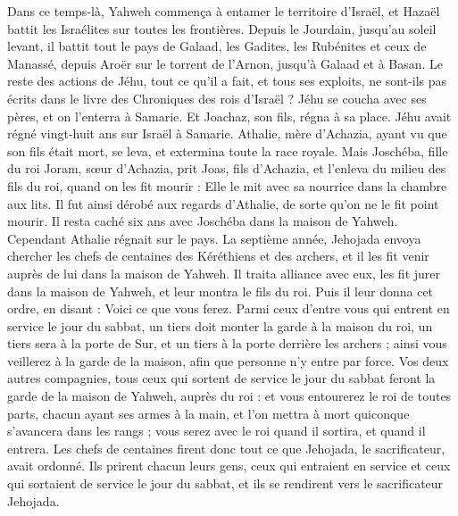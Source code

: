 \begin{multicols}{2}
Dans ce temps-là, Yahweh commença à entamer le territoire d’Israël, et Hazaël battit les Israélites sur toutes les frontières.
Depuis le Jourdain, jusqu’au soleil levant, il battit tout le pays de Galaad, les Gadites, les Rubénites et ceux de Manassé, depuis Aroër sur le torrent de l’Arnon, jusqu’à Galaad et à Basan.
Le reste des actions de Jéhu, tout ce qu’il a fait, et tous ses exploits, ne sont-ils pas écrits dans le livre des Chroniques des rois d’Israël ?
Jéhu se coucha avec ses pères, et on l’enterra à Samarie. Et Joachaz, son fils, régna à sa place.
Jéhu avait régné vingt-huit ans sur Israël à Samarie.
\VerseOne{}Athalie, mère d’Achazia, ayant vu que son fils était mort, se leva, et extermina toute la race royale.
Mais Joschéba, fille du roi Joram, sœur d’Achazia, prit Joas, fils d’Achazia, et l’enleva du milieu des fils du roi, quand on les fit mourir : Elle le mit avec sa nourrice dans la chambre aux lits. Il fut ainsi dérobé aux regards d’Athalie, de sorte qu’on ne le fit point mourir.
Il resta caché six ans avec Joschéba dans la maison de Yahweh. Cependant Athalie régnait sur le pays.
La septième année, Jehojada envoya chercher les chefs de centaines des Kéréthiens et des archers, et il les fit venir auprès de lui dans la maison de Yahweh. Il traita alliance avec eux, les fit jurer dans la maison de Yahweh, et leur montra le fils du roi.
Puis il leur donna cet ordre, en disant : Voici ce que vous ferez. Parmi ceux d’entre vous qui entrent en service le jour du sabbat, un tiers doit monter la garde à la maison du roi,
un tiers sera à la porte de Sur, et un tiers à la porte derrière les archers ; ainsi vous veillerez à la garde de la maison, afin que personne n’y entre par force.
Vos deux autres compagnies, tous ceux qui sortent de service le jour du sabbat feront la garde de la maison de Yahweh, auprès du roi :
et vous entourerez le roi de toutes parts, chacun ayant ses armes à la main, et l’on mettra à mort quiconque s’avancera dans les rangs ; vous serez avec le roi quand il sortira, et quand il entrera.
Les chefs de centaines firent donc tout ce que Jehojada, le sacrificateur, avait ordonné. Ils prirent chacun leurs gens, ceux qui entraient en service et ceux qui sortaient de service le jour du sabbat, et ils se rendirent vers le sacrificateur Jehojada.

\end{multicols}
